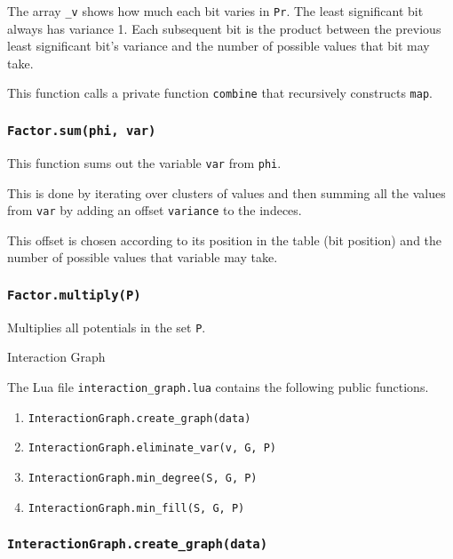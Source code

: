 \documentclass{amsart}
\makeatletter
\def\subsection{\@startsection{subsection}{3}%
  \z@{.5\linespacing\@plus.7\linespacing}{.1\linespacing}%
  {\normalfont\itshape}}
\theoremstyle{plain}
\newcommand{\code}[1]{\lstinline[mathescape=true]{#1}}
\makeatother
\begin{document}
The array \code{_v} shows how much each bit varies in \code{Pr}. The least significant bit always
has variance 1. Each subsequent bit is the product between the previous least significant bit's
variance and the number of possible values that bit may take.

This function calls a private function \code{combine} that recursively constructs \code{map}.

\subsubsection{\code{Factor.sum(phi, var)}}

This function sums out the variable \code{var} from \code{phi}.

This is done by iterating over clusters of values and then summing all the values from \code{var}
by adding an offset \code{variance} to the indeces.

This offset is chosen according to its position in the table (bit position) and the number of
possible values that variable may take.

\subsubsection{\code{Factor.multiply(P)}}

Multiplies all potentials in the set \code{P}.

\subsection{Interaction Graph}

The Lua file \code{interaction_graph.lua} contains the following public functions.

\begin{enumerate}
  \item \code{InteractionGraph.create_graph(data)}
  \item \code{InteractionGraph.eliminate_var(v, G, P)}
  \item \code{InteractionGraph.min_degree(S, G, P)}
  \item \code{InteractionGraph.min_fill(S, G, P)}
\end{enumerate}

\subsubsection{\code{InteractionGraph.create_graph(data)}}
\end{document}
